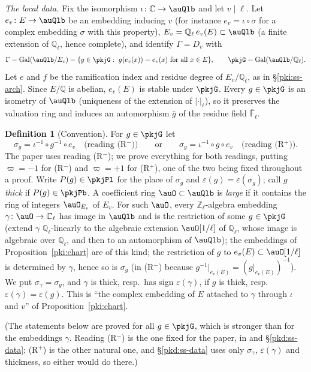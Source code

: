 \documentclass[10pt]{amsart}
\theoremstyle{definition}
\newtheorem{definition}[theorem]{Definition}
\theoremstyle{remark}
\newcommand{\C}{\mathbb C}
\newcommand{\Z}{\mathbb Z}
\newcommand{\Q}{\mathbb Q}
\begin{document}
\emph{The local data.} Fix the isomorphism $\iota\colon\C\to\auQlb$ and let $v\mid\ell$. Let
$e_v\colon E\to\auQlb$ be an embedding inducing $v$ (for instance $e_v=\iota\circ\sigma$ for a complex
embedding $\sigma$ with this property), $E_v=\Q_\ell\,e_v(E)\subset\auQlb$ (a finite extension of
$\Q_\ell$, hence complete), and identify $\Gamma=D_v$ with
\[
\Gamma=\operatorname{Gal}(\auQlb/E_v)=\{g\in\pkjG:\ g(e_v(x))=e_v(x)\ \text{for all }x\in E\},
\qquad \pkjG=\operatorname{Gal}(\auQlb/\Q_\ell).
\]
Let $e$ and $f$ be the ramification index and residue degree of $E_v/\Q_\ell$, as in
\S\ref{pki:ss-arch}. Since $E/\Q$ is abelian, $e_v(E)$ is stable under $\pkjG$. Every $g\in\pkjG$ is an
isometry of $\auQlb$ (uniqueness of the extension of $|\cdot|_\ell$), so it preserves the valuation
ring and induces an automorphism $\bar g$ of the residue field $\overline{\mathbb F}_\ell$.

\begin{definition}[Convention]\label{pkj:conv}
For $g\in\pkjG$ let
\[
\sigma_g=\iota^{-1}\circ g^{-1}\circ e_v\quad\text{(reading (R$^-$))}\qquad\text{or}\qquad
\sigma_g=\iota^{-1}\circ g\circ e_v\quad\text{(reading (R$^+$))}.
\]
The paper uses reading (R$^-$); we prove everything for both readings, putting $\varpi=-1$ for (R$^-$)
and $\varpi=+1$ for (R$^+$), one of the two being fixed throughout a proof. Write
$P(g)\in\pkjPl$ for the place of $\sigma_g$ and $\varepsilon(g)=\varepsilon(\sigma_g)$; call $g$
\emph{thick} if $P(g)\in\pkjPb$. A coefficient ring $\auO\subset\auQlb$ is \emph{large} if it contains
the ring of integers $\auO_{E_v}$ of $E_v$. For such $\auO$, every $\Z_\ell$-algebra embedding $\gamma\colon\auO\to
\C_\ell$ has image in $\auQlb$ and is the restriction of some $g\in\pkjG$ (extend $\gamma$ $\Q_\ell$-linearly to the algebraic extension $\auO[1/\ell]$ of $\Q_\ell$, whose image is algebraic over $\Q_\ell$, and then to an automorphism of $\auQlb$); the embeddings of Proposition~\ref{pki:chart} are of this kind; the restriction of $g$ to
$e_v(E)\subset\auO[1/\ell]$ is determined by $\gamma$, hence so is $\sigma_g$ (in (R$^-$) because
$g^{-1}|_{e_v(E)}=(g|_{e_v(E)})^{-1}$). We put $\sigma_\gamma=\sigma_g$, and $\gamma$ is thick,
resp.\ has sign $\varepsilon(\gamma)$, if $g$ is thick, resp.\ $\varepsilon(\gamma)=\varepsilon(g)$.
This is ``the complex embedding of $E$ attached to $\gamma$ through $\iota$ and $v$'' of
Proposition~\ref{pki:chart}.
\end{definition}

(The statements below are proved for all $g\in\pkjG$, which is stronger than for the embeddings
$\gamma$. Reading (R$^-$) is the one fixed for the paper, in {\cite[\S5.1]{P55}} and
\S\ref{pkd:ss-data}; (R$^+$) is the other natural one, and \S\ref{pkd:ss-data} uses only
$\sigma_\gamma$, $\varepsilon(\gamma)$ and thickness, so either would do there.)
\end{document}
